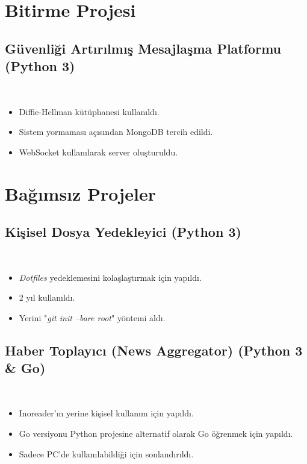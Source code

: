 \documentclass[a4paper, 9pt]{extarticle}
\begin{document}
\makebaslik{}
\myegitim{}
\mydeneyim{}

\section{Bitirme Projesi}
\subsection{Güvenliği Artırılmış Mesajlaşma Platformu (Python 3)} \hfill \\
\begin{itemize}
    \item Diffie-Hellman kütüphanesi kullanıldı.
    \item Sistem yormaması açısından MongoDB tercih edildi.
    \item WebSocket kullanılarak server oluşturuldu.
\end{itemize}

\section{Bağımsız Projeler}
\subsection{Kişisel Dosya Yedekleyici (Python 3)} \hfill \\
\begin{itemize}
    \item \emph{Dotfiles} yedeklemesini kolaşlaştırmak için yapıldı.
    \item 2 yıl kullanıldı.
    \item Yerini "\emph{git init --bare root}" yöntemi aldı.
\end{itemize}

\subsection{Haber Toplayıcı (News Aggregator) (Python 3 \& Go)} \hfill \\
\begin{itemize}
   \item Inoreader'ın yerine kişisel kullanım için yapıldı.
    \item Go versiyonu Python projesine alternatif olarak Go öğrenmek için yapıldı.
    \item Sadece PC'de kullanılabildiği için sonlandırıldı.
\end{itemize}
\end{document}

